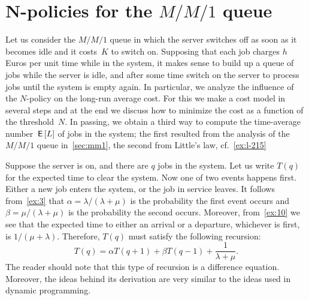 
\section{N-policies for the $M/M/1$ queue}
\label{sec:n-policies}


Let us consider the $M/M/1$ queue in which the server switches off as soon as it becomes idle and it costs~$K$ to switch on.
Supposing that each job charges $h$ Euros per unit time while in the system, it makes sense to build up a queue of jobs while the server is idle, and after some time switch on the server to process jobs until the system is empty again.
In particular, we analyze the influence of the $N$-policy on the long-run average cost.
For this we make a cost model in several steps and at the end we discuss how to minimize the cost as a function of the threshold~$N$.
In passing, we obtain a third way to compute the time-average number $\,\mathsf{E}\left[L\right]$ of jobs in the system; the first resulted from the analysis of the $M/M/1$ queue in~\cref{sec:mm1}, the second from Little's law, cf.~\cref{ex:l-215}




Suppose the server is on, and there are $q$ jobs in the system.
Let us write $T(q)$ for the expected time to clear the system.
Now one of two events happens first.
Either a new job enters the system, or the job in service leaves.
It follows from~\cref{ex:3} that $\alpha=\lambda/(\lambda+\mu)$ is the probability the first event occurs and $\beta=\mu/(\lambda+\mu)$ is the probability the second occurs.
Moreover, from~\cref{ex:10} we see that the expected time to either an arrival or a departure, whichever is first, is $1/(\mu+\lambda)$.
Therefore, $T(q)$ must satisfy the following recursion:
\begin{equation}
  \label{eq:92}
  T(q) = \alpha T(q+1) + \beta T(q-1) + \frac{1}{\lambda+\mu}. 
\end{equation}
The reader should note that this type of recursion is a difference equation.
Moreover, the ideas behind its derivation are very similar to the ideas used in dynamic programming.

